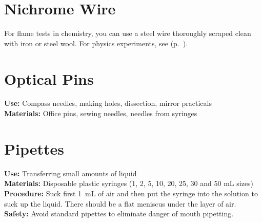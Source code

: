 \begin{multicols}{2}
\section{Nichrome Wire} 
\label{sec:nichrome-wire}
For flame tests in chemistry, 
you can use a steel wire thoroughly scraped clean with iron or steel wool. 
For physics experiments, 
see  (p.~\pageref{sec:wire}).

\section{Optical Pins} 
\label{sec:optical-pins}
\vspace{-10pt}
\textbf{Use:} Compass needles, making holes, dissection, mirror practicals\\
\textbf{Materials:} Office pins, sewing needles, needles from syringes

\section{Pipettes} 
\label{sec:pipettes}
\vspace{-10pt}
\textbf{Use:} Transferring small amounts of liquid\\
\textbf{Materials:} Disposable plastic syringes (1, 2, 5, 10, 20, 25, 30 and 50 mL sizes)\\
\textbf{Procedure:} Suck first 1~mL of air and then put the syringe into the solution to suck up the liquid. There should be a flat meniscus under the layer of air.\\
\textbf{Safety:} Avoid standard pipettes to eliminate danger of mouth pipetting.


\end{multicols}
